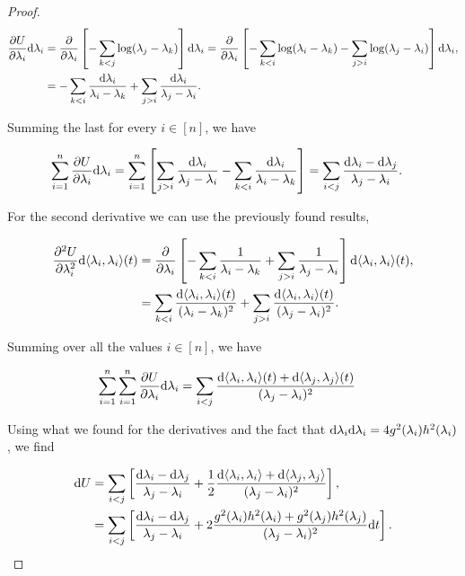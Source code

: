 \begin{proof}
    \begin{align*}
        \frac{\partial U}{\partial \lambda_i} \mathrm d\lambda_i &= \frac{\partial}{\partial \lambda_i}\left[ -\sum_{k<j} \log( \lambda_j - \lambda_k) \right] \mathrm d \lambda_i = \frac{\partial}{\partial \lambda_i}\left[ -\sum_{k<i} \log( \lambda_i - \lambda_k) - \sum_{j>i} \log(\lambda_j - \lambda_i) \right] \mathrm d \lambda_i,\\
        &= -\sum_{k<i} \frac{\mathrm d \lambda_i}{\lambda_i - \lambda_k} + \sum_{j>i} \frac{\mathrm d \lambda_i}{\lambda_j - \lambda_i}.
    \end{align*}

    Summing the last for every $i \in [n]$, we have

    \begin{align*}
        \sum_{i=1}^n \frac{\partial U}{\partial \lambda_i} \mathrm d \lambda_i &= \sum_{i=1}^n \left[  \sum_{j>i} \frac{\mathrm d \lambda_i}{\lambda_j - \lambda_i} - \sum_{k<i} \frac{\mathrm d \lambda_i}{\lambda_i - \lambda_k}\right] = \sum_{i<j} \frac{\mathrm d \lambda_{i} - \mathrm d \lambda_{j}}{\lambda_{j} - \lambda_{i}}.
    \end{align*}

    For the second derivative we can use the previously found results,

    \begin{align*}
        \frac{\partial^2 U}{\partial \lambda_i^2}\mathrm d\langle \lambda_i, \lambda_i\rangle(t) &= \frac{\partial}{\partial \lambda_i} \left[ -\sum_{k<i} \frac{1}{\lambda_i - \lambda_k} + \sum_{j>i} \frac{1}{\lambda_j - \lambda_i} \right]\mathrm d\langle \lambda_i, \lambda_i\rangle(t),\\
        &= \sum_{k<i} \frac{\mathrm d\langle \lambda_i, \lambda_i\rangle(t)}{(\lambda_i - \lambda_k)^2} + \sum_{j>i} \frac{\mathrm d\langle \lambda_i, \lambda_i\rangle(t)}{(\lambda_j-\lambda_i)^2}.
    \end{align*}

    Summing over all the values $i \in [n]$, we have 

    \begin{align*}
        \sum_{i=1}^n \sum_{i=1}^n \frac{\partial U}{\partial \lambda_i} \mathrm d \lambda_i &= \sum_{i<j} \frac{\mathrm d\langle \lambda_i, \lambda_i\rangle(t) + \mathrm d\langle \lambda_j, \lambda_j\rangle(t)}{(\lambda_j - \lambda_i)^2}
    \end{align*}
    
    Using what we found for the derivatives and the fact that $\mathrm d \lambda_i\mathrm d\lambda_i = 4g^2(\lambda_i)h^2(\lambda_i)$, we find

    \begin{align*}
        \mathrm d U &= \sum_{i < j} \left[\frac{\mathrm d \lambda_i - \mathrm d \lambda_j}{\lambda_j - \lambda_i} + \frac12\frac{\mathrm d\langle \lambda_i, \lambda_i \rangle + \mathrm d\langle \lambda_j, \lambda_j \rangle}{(\lambda_j - \lambda_i)^2}\right],\\
        &= \sum_{i<j} \left[\frac{\mathrm d \lambda_i - \mathrm d \lambda_j}{\lambda_j - \lambda_i} + 2\frac{g^2(\lambda_i)h^2(\lambda_i)+g^2(\lambda_j)h^2(\lambda_j)}{(\lambda_j - \lambda_i)^2}\mathrm d t\right].
    \end{align*}


\end{proof}

